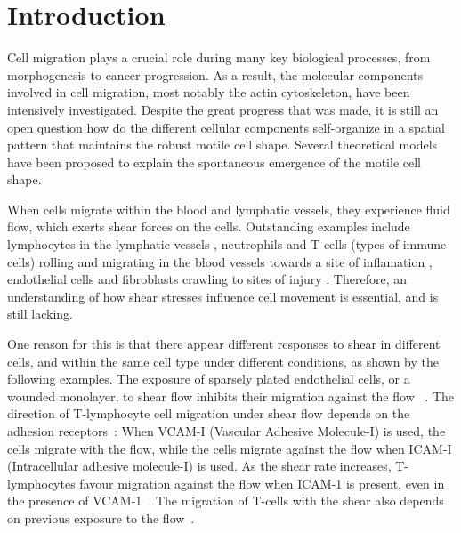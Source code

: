 \documentclass[
reprint,
superscriptaddress,
 amsmath,amssymb,
 aps,
prl,
floatfix]{revtex4-2}
\begin{document}
\maketitle

\section{Introduction}
Cell migration plays a crucial role during many key biological processes, from morphogenesis to cancer progression. As a result, the molecular components involved in cell migration, most notably the actin cytoskeleton, have been intensively investigated. Despite the great progress that was made, it is still an open question how do the different cellular components self-organize in a spatial pattern that maintains the robust motile cell shape. Several theoretical models have been proposed to explain the spontaneous emergence of the motile cell shape.

When cells migrate within the blood and lymphatic vessels, they experience fluid flow, which exerts shear forces on the cells. Outstanding examples include lymphocytes in the lymphatic vessels \cite{von2003homing}, neutrophils and  T cells (types of immune cells) rolling and migrating in the blood vessels towards a site of inflamation \cite{luster2005immune,shulman2009lymphocyte}, endothelial cells \cite{alghanem2021swell1} and fibroblasts crawling to sites of injury \cite{kole2005intracellular}. Therefore, an understanding of how shear stresses influence cell movement is essential, and is still lacking. 

One reason for this is that there appear different responses to shear in different cells, and within the same cell type under different conditions, as shown by the following examples. The exposure of sparsely plated endothelial cells, or a wounded monolayer, to shear flow inhibits their migration against the flow ~\cite{ZaidelBar2005}. The direction of T-lymphocyte cell migration under shear flow depends on the adhesion receptors~\cite{Dominguez2015, Anderson2019}: When VCAM-I (Vascular Adhesive Molecule-I) is used, the cells migrate with the flow, while the cells migrate against the flow when ICAM-I (Intracellular adhesive molecule-I) is used. As the shear rate increases, T-lymphocytes favour migration against the flow when ICAM-1 is present, even in the presence of VCAM-1~\cite{Dominguez2015}. The migration of T-cells with the shear also depends on previous exposure to the flow~\cite{Piechocka2021}.
\end{document}
